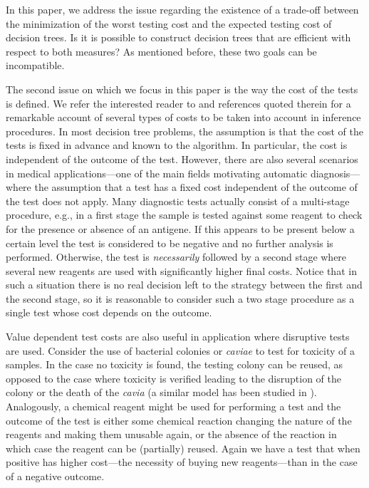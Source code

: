 \documentclass{llncs}
\begin{document}
In this paper, we address the issue regarding the existence of a trade-off between the minimization 
of the worst testing cost and the
expected testing cost of decision trees. Is it is possible to 
construct decision trees that are efficient with 
respect to both measures? As mentioned before, these two goals can be incompatible.


 
The second issue on which we focus in this paper is the way the cost of the tests is defined. 
We refer the interested reader to \cite{Turney} and references quoted therein for a 
remarkable account of several types of costs to be taken into account in inference procedures. 
In most decision tree problems, the assumption is that the cost of the tests is fixed in advance and known to the algorithm. In particular, 
the cost is independent of the outcome of the test. However, there are also several scenarios in medical 
applications---one of the main fields motivating automatic diagnosis---where the assumption that a test has a fixed cost independent 
of the outcome of the test does not apply. Many diagnostic tests  actually consist of a multi-stage procedure, e.g.,  
in a first stage the sample is tested against some reagent to check for the presence or absence of an antigene. If this appears to be present below a certain level 
the test is considered to be negative and no further analysis is performed. Otherwise, the test is {\em necessarily} followed by a second stage 
where several new reagents are used with  significantly higher final costs. Notice that in such a situation there is no real decision left to the strategy between the first and the second stage, so it is reasonable to consider such a two stage procedure as a single test whose cost depends on the outcome. 


Value dependent test costs are also useful in application where disruptive tests are used.
 Consider the use of bacterial colonies or {\em caviae} to test for toxicity of a samples. In the case no toxicity is found, the testing colony can be reused, as opposed to the case where toxicity is verified leading to the disruption of the colony or the death of the 
{\em cavia} (a similar model has been studied in \cite{Elser-Kleber}). Analogously, a chemical reagent might be used for performing a test and the outcome of the test is either some chemical reaction changing the nature of the reagents and making them unusable again, 
or the absence of the reaction in which case the reagent can be (partially) reused. 
Again we have a test that when positive has higher cost---the necessity of buying new reagents---than in the case of a negative outcome.
\end{document}
